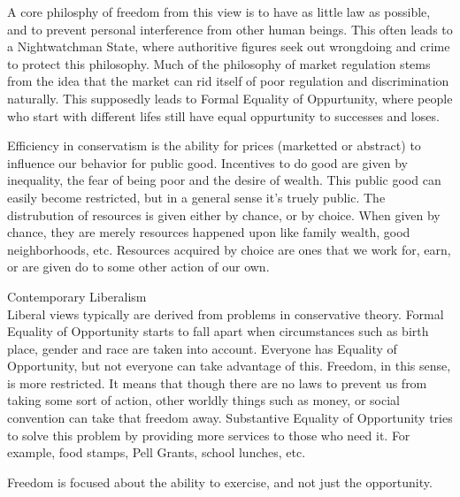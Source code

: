 \documentclass{article}
\begin{document}
A core philosphy of freedom from this view is to have as little law as possible, and to prevent personal interference from other human beings. This often leads to a Nightwatchman State, where authoritive figures seek out wrongdoing and crime to protect this philosophy.
Much of the philosophy of market regulation stems from the idea that the market can rid itself of poor regulation and discrimination naturally. This supposedly leads to Formal Equality of Oppurtunity, where people who start with different lifes still have equal oppurtunity to successes and loses.

Efficiency in conservatism is the ability for prices (marketted or abstract) to influence our behavior for public good. Incentives to do good are given by inequality, the fear of being poor and the desire of wealth. This public good can easily become restricted, but in a general sense it's truely public. The distrubution of resources is given either by chance, or by choice. When given by chance, they are merely resources happened upon like family wealth, good neighborhoods, etc. Resources acquired by choice are ones that we work for, earn, or are given do to some other action of our own.

\noindent
\Large
Contemporary Liberalism\\
\normalsize
\indent
Liberal views typically are derived from problems in conservative theory. Formal Equality of Opportunity starts to fall apart when circumstances such as birth place, gender and race are taken into account. Everyone has Equality of Opportunity, but not everyone can take advantage of this. Freedom, in this sense, is more restricted. It means that though there are no laws to prevent us from taking some sort of action, other worldly things such as money, or social convention can take that freedom away. Substantive Equality of Opportunity tries to solve this problem by providing more services to those who need it. For example, food stamps, Pell Grants, school lunches, etc.

Freedom is focused about the ability to exercise, and not just the opportunity.
\end{document}
